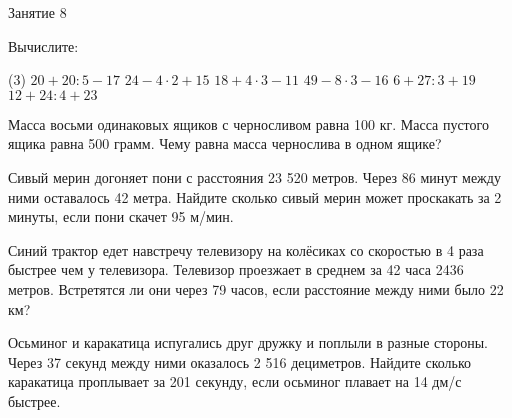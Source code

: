 \begin{class}[number=8]
	\begin{listofex}
		\item Занятие 8
	\end{listofex}
\end{class}

\begin{homework}[number=4]
	\begin{listofex}
		\item Вычислите:
		\begin{tasks}(3)
			\task \( 20 + 20 : 5 - 17 \)
			\task \( 24 - 4 \cdot 2 + 15 \)
			\task \( 18 + 4 \cdot 3 - 11 \)
			\task \( 49 - 8 \cdot 3 - 16 \)
			\task \( 6 + 27 : 3 + 19 \)
			\task \( 12 + 24 : 4 + 23 \)
		\end{tasks}
		\item Масса восьми одинаковых ящиков с черносливом равна 100 кг. Масса пустого ящика равна 500 грамм. Чему равна масса чернослива в одном ящике?
		\item Сивый мерин догоняет пони с расстояния 23 520 метров. Через 86 минут между ними оставалось 42 метра. Найдите сколько сивый мерин может проскакать за 2 минуты, если пони скачет 
		95 м/мин.
		\item Синий трактор едет навстречу телевизору на колёсиках со скоростью в 4 раза быстрее чем у телевизора. Телевизор проезжает в среднем за 42 часа 2436 метров. Встретятся ли они через 79  часов, если расстояние между ними было 22 км?
		\item Осьминог и каракатица испугались друг дружку и поплыли в разные стороны. Через 37 секунд между ними оказалось 2 516 дециметров. Найдите сколько каракатица проплывает за 201 секунду, если осьминог плавает на 14 дм/с быстрее.
	\end{listofex}
\end{homework}
